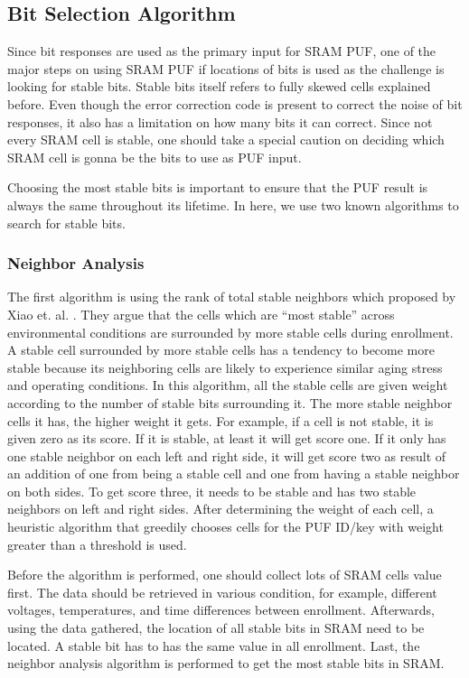 \subsection{Bit Selection Algorithm} \label{lbl:bit-selection}
Since bit responses are used as the primary input for SRAM PUF, one of the major steps on using SRAM PUF if locations of bits is used as the challenge is looking for stable bits. Stable bits itself refers to fully skewed cells explained before.
Even though the error correction code is present to correct the noise of bit responses, it also has a limitation on how many bits it can correct.
Since not every SRAM cell is stable, one should take a special caution on deciding which SRAM cell is gonna be the bits to use as PUF input.

Choosing the most stable bits is important to ensure that the PUF result is always the same throughout its lifetime.
In here, we use two known algorithms to search for stable bits.

\subsubsection{Neighbor Analysis}
The first algorithm is using the rank of total stable neighbors which proposed by Xiao et. al. \cite{xiao_rahman_forte_huang_su_tehranipoor_2014}. They argue that the cells which are “most stable” across environmental conditions are surrounded by more stable cells during enrollment. A stable cell surrounded by more stable cells has a tendency to become more stable because its neighboring cells are likely to experience similar aging stress and operating conditions.
In this algorithm, all the stable cells are given weight according to the number of stable bits surrounding it.
The more stable neighbor cells it has, the higher weight it gets. For example, if a cell is not stable, it is given zero as its score. If it is stable, at least it will get score one. If it only has one stable neighbor on each left and right side, it will get score two as result of an addition of one from being a stable cell and one from having a stable neighbor on both sides. To get score three, it needs to be stable and has two stable neighbors on left and right sides.
After determining the weight of each cell, a heuristic algorithm that greedily chooses cells for the PUF ID/key with weight greater than a threshold is used.

Before the algorithm is performed, one should collect lots of SRAM cells value first. The data should be retrieved in various condition, for example, different voltages, temperatures, and time differences between enrollment.
Afterwards, using the data gathered, the location of all stable bits in SRAM need to be located. A stable bit has to has the same value in all enrollment.
Last, the neighbor analysis algorithm is performed to get the most stable bits in SRAM.


